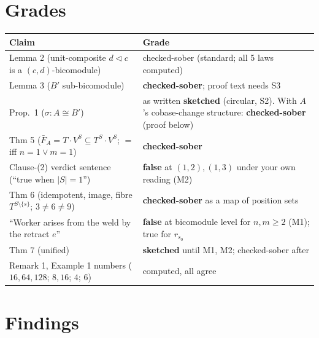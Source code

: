 \documentclass[10pt]{article}
\newcommand{\tri}{\mathbin{\triangleleft}}
\begin{document}
\section*{Grades}
\begin{tabular}{@{}p{}p{}@{}}
\toprule
Claim & Grade\\\midrule
Lemma 2 (unit-composite $d\tri c$ is a $(c,d)$-bicomodule) & checked-sober (standard; all 5 laws computed)\\
Lemma 3 ($B'$ sub-bicomodule) & \textbf{checked-sober}; proof text needs S3\\
Prop.~1 ($\sigma\colon A\cong B'$) & as written \textbf{sketched} (circular, S2). With $A$'s cobase-change structure: \textbf{checked-sober} (proof below)\\
Thm 5 ($\bar F_A=T\cdot V^S\subseteq T^S\cdot V^S$; $=$ iff $n=1\vee m=1$) & \textbf{checked-sober}\\
Clause-(2) verdict sentence (``true when $|S|=1$'') & \textbf{false} at $(1,2),(1,3)$ under your own reading (M2)\\
Thm 6 (idempotent, image, fibre $T^{S\setminus\{s\}}$; $3\ne6\ne9$) & \textbf{checked-sober} as a map of position sets\\
``Worker arises from the weld by the retract $e$'' & \textbf{false} at bicomodule level for $n,m\ge2$ (M1); true for $r_{s_0}$\\
Thm 7 (unified) & \textbf{sketched} until M1, M2; checked-sober after\\
Remark 1, Example 1 numbers ($16,64,128$; $8,16$; $4$; $6$) & computed, all agree\\
\bottomrule
\end{tabular}

\section*{Findings}
\end{document}

